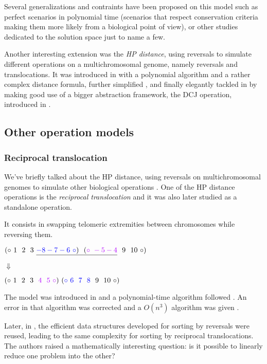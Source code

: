 \documentclass[11pt,final,twoside,nofrench]{thlifl}
\begin{document}
Several generalizations and contraints have been proposed on this model such as perfect scenarios in polynomial time \cite{ST05} \cite{BBCP07} \cite{BBCP08} (scenarios that respect conservation criteria making them more likely from a biological point of view), or other studies dedicated to the solution space \cite{BS07} \cite{B09} just to name a few.

Another interesting extension was the \emph{HP distance}, using reversals to simulate different operations on a multichromosomal genome, namely reversals and translocations. It was introduced in \cite{HP-95} with a polynomial algorithm and a rather complex distance formula, further simplified \cite{OS03} \cite{JN07}, and finally elegantly tackled in \cite{BMS08} by making good use of a bigger abstraction framework, the DCJ operation, introduced in  \cite{Yancopoulos05}.

\subsection{Other operation models}

\subsubsection*{Reciprocal translocation}

We've briefly talked about the HP distance, using reversals on multichromosomal genomes to simulate other biological operations \cite{HP-95}. One of the HP distance operations is the \emph{reciprocal translocation} and it was also later studied as a standalone operation.

It consists in swapping telomeric extremities between chromosomes while reversing them.

\begin{center}
$(\circ~1~~2~~3~\underline{\textcolor{blue}{-8-7-6~\circ})~~(\textcolor{purple}{\circ~-5-4}}~~9~~10~\circ)$

$\Downarrow$

$(\circ~1~~2~~3~~\textcolor{purple}{4~~5~\circ})~(\textcolor{blue}{\circ~6~~7~~8}~~9~~10~\circ)$
\end{center}

The model was introduced in \cite{KR95} and a polynomial-time algorithm followed \cite{H95}.
An error in that algorithm was corrected and a $O(n^3)$ algorithm was given \cite{BMS05}.

Later, in \cite{OS06}, the efficient data structures developed for sorting by reversals were reused, leading to the same complexity for sorting by reciprocal translocations. The authors raised a mathematically interesting question: is it possible to linearly reduce one problem into the other?
\end{document}

